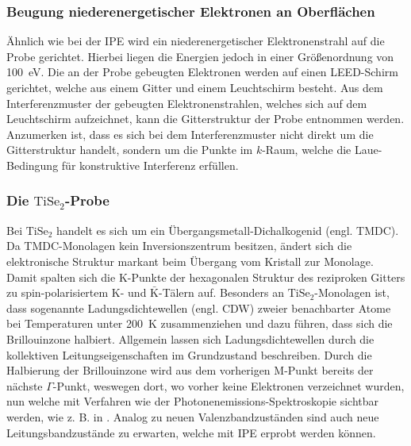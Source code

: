 \subsubsection{Beugung niederenergetischer Elektronen an Oberflächen}

Ähnlich wie bei der IPE wird ein niederenergetischer Elektronenstrahl auf die Probe gerichtet.
Hierbei liegen die Energien jedoch in einer Größenordnung von \SI{100}{\electronvolt}\cite{wiki_leed}.
Die an der Probe gebeugten Elektronen werden auf einen LEED-Schirm gerichtet, welche aus einem Gitter und einem Leuchtschirm besteht.
Aus dem Interferenzmuster der gebeugten Elektronenstrahlen, welches sich auf dem Leuchtschirm aufzeichnet, kann die Gitterstruktur der Probe entnommen werden.
Anzumerken ist, dass es sich bei dem Interferenzmuster nicht direkt um die Gitterstruktur handelt, sondern um die Punkte im $k$-Raum, welche die Laue-Bedingung für konstruktive Interferenz erfüllen.

\subsubsection{\texorpdfstring{Die $\text{TiSe}_2$-Probe}{Die TiSe2-Probe}}

Bei $\text{TiSe}_2$ handelt es sich um ein Übergangsmetall-Dichalkogenid (engl. TMDC).
Da TMDC-Monolagen kein Inversionszentrum besitzen, ändert sich die elektronische Struktur markant beim Übergang vom Kristall zur Monolage.
Damit spalten sich die K-Punkte der hexagonalen Struktur des reziproken Gitters zu spin-polarisiertem K- und $\bar{\text{K}}$-Tälern auf. %
Besonders an $\text{TiSe}_2$-Monolagen ist, dass sogenannte Ladungsdichtewellen (engl. CDW) zweier benachbarter Atome bei Temperaturen unter \SI{200}{\kelvin} zusammenziehen und dazu führen, dass sich die Brillouinzone halbiert.
Allgemein lassen sich Ladungsdichtewellen durch die kollektiven Leitungseigenschaften im Grundzustand beschreiben.%
Durch die Halbierung der Brillouinzone wird aus dem vorherigen M-Punkt bereits der nächste $\Gamma$-Punkt, weswegen dort, wo vorher keine Elektronen verzeichnet wurden, nun welche mit Verfahren wie der Photonenemissions-Spektroskopie sichtbar werden, wie z. B. in \cite{tise_pe}.
Analog zu neuen Valenzbandzuständen sind auch neue Leitungsbandzustände zu erwarten, welche mit IPE erprobt werden können. %


